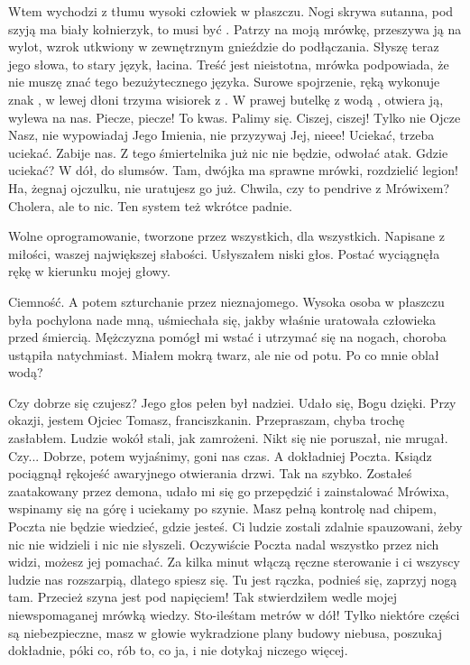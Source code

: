 Wtem wychodzi z tłumu wysoki człowiek w płaszczu.
Nogi skrywa sutanna, pod szyją ma biały kołnierzyk, to musi być \censor{}.
Patrzy na moją mrówkę, przeszywa ją na wylot, wzrok utkwiony w zewnętrznym gnieździe do podłączania.
Słyszę teraz jego słowa, to stary język, łacina. Treść jest nieistotna, mrówka podpowiada, że nie muszę znać tego bezużytecznego języka.
Surowe spojrzenie, ręką wykonuje znak \censor{}, w lewej dłoni trzyma wisiorek z \censor{}.
W prawej butelkę z wodą \censor{}, otwiera ją, wylewa na nas.
Piecze, piecze! To kwas. Palimy się. 
Ciszej, ciszej! Tylko nie Ojcze Nasz, nie wypowiadaj Jego Imienia, nie przyzywaj Jej, nieee!
Uciekać, trzeba uciekać. Zabije nas. Z tego śmiertelnika już nic nie będzie, odwołać atak.
Gdzie uciekać? W dół, do slumsów. Tam, dwójka ma sprawne mrówki, rozdzielić legion!
Ha, żegnaj ojczulku, nie uratujesz go już. Chwila, czy to pendrive z Mrówixem? Cholera, ale to nic. Ten system też wkrótce padnie.

\begin{dialogue}
\ds{} Wolne oprogramowanie, tworzone przez wszystkich, dla wszystkich. Napisane z miłości, waszej największej słabości. \dm{} Usłyszałem niski głos. \dm{}
Postać wyciągnęła rękę w kierunku mojej głowy.
\end{dialogue}

Ciemność. A potem szturchanie przez nieznajomego.
Wysoka osoba w płaszczu była pochylona nade mną, uśmiechała się, jakby właśnie uratowała człowieka przed śmiercią.
Mężczyzna pomógł mi wstać i utrzymać się na nogach, choroba ustąpiła natychmiast.
Miałem mokrą twarz, ale nie od potu. Po co mnie oblał wodą?

\begin{dialogue}
\ds{} Czy dobrze się czujesz? \dm{} Jego głos pełen był nadziei. \dm{} Udało się, Bogu dzięki. Przy okazji, jestem Ojciec Tomasz, franciszkanin.
\ds{} Przepraszam, chyba trochę zasłabłem. \dm{} Ludzie wokół stali, jak zamrożeni. Nikt się nie poruszał, nie mrugał. \dm{}
Czy... 
\ds{} Dobrze, potem wyjaśnimy, goni nas czas. A dokładniej Poczta. \dm{} Ksiądz pociągnął rękojeść awaryjnego otwierania drzwi.
\dm{} Tak na szybko. Zostałeś zaatakowany przez demona, udało mi się go przepędzić i zainstalować Mrówixa, wspinamy się na górę i uciekamy po szynie.
Masz pełną kontrolę nad chipem, Poczta nie będzie wiedzieć, gdzie jesteś.
Ci ludzie zostali zdalnie spauzowani, żeby nic nie widzieli i nic nie słyszeli. Oczywiście Poczta nadal wszystko przez nich widzi, możesz jej pomachać.
Za kilka minut włączą ręczne sterowanie i ci wszyscy ludzie nas rozszarpią, dlatego spiesz się. Tu jest rączka, podnieś się, zaprzyj nogą tam.
\ds{} Przecież szyna jest pod napięciem! \dm{} Tak stwierdziłem wedle mojej niewspomaganej mrówką wiedzy. \dm{} Sto-ileśtam metrów w dół!
\ds{} Tylko niektóre części są niebezpieczne, masz w głowie wykradzione plany budowy niebusa, poszukaj dokładnie, póki co, rób to, co ja, i nie dotykaj niczego więcej.
\end{dialogue}

